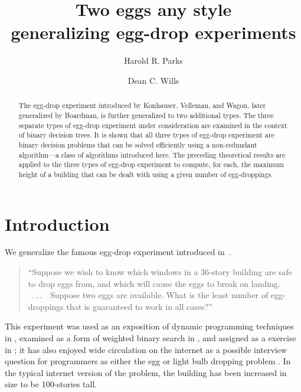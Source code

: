 \documentclass[12pt]{amsart}
\theoremstyle{definition}
\theoremstyle{theorem}
\begin{document}
\title{Two eggs any style \\ generalizing egg-drop experiments}
\author{Harold R. Parks}
\address {Department of Mathematics\\
 Oregon State University\\ 
 Corvallis\\ 
 Oregon 97331 USA}
\author{Dean C. Wills}
\address{AppDynamics, San Francisco, California 94107 USA}

\begin{abstract}
	The egg-drop experiment introduced by Konhauser, Velleman, and Wagon, later  generalized by Boardman, is further generalized to two additional types. 
The three separate types of egg-drop experiment under consideration are examined in the context of binary decision trees. It is shown that all three types of egg-drop experiment are binary decision problems that can be solved  efficiently using a non-redundant algorithm---a class of algorithms introduced here. 
The preceding theoretical results are applied to the three types of egg-drop experiment to compute, for each, the maximum height of a building that can be dealt with using a given number of egg-droppings.
\end{abstract}

\maketitle

\section{Introduction}
We generalize the famous egg-drop experiment introduced \mbox{in \cite{konhauser1996way}.}

\begin{quote}
``Suppose we wish to know which windows in a $36$-story building are safe to drop eggs from, 
and which will cause the eggs to break on landing. \ .\,.\,.\ \ Suppose two eggs are 
available. What is the least number of egg-droppings that is guaranteed to 
work in all cases?''
\end{quote}

This experiment was used as an exposition of dynamic programming techniques in \cite{Sniedovich}, examined as a form of weighted binary search in \cite{Wills:2009:CCP:1834851}, and assigned as a exercise in \cite{skiena2009algorithm}; it has also enjoyed wide circulation on the internet
as a possible interview question for programmers as either the egg or light bulb dropping problem \cite{brilliant}.  In the typical
internet version of the problem, the building has been increased 
in size to be 100-stories tall.
\end{document}
